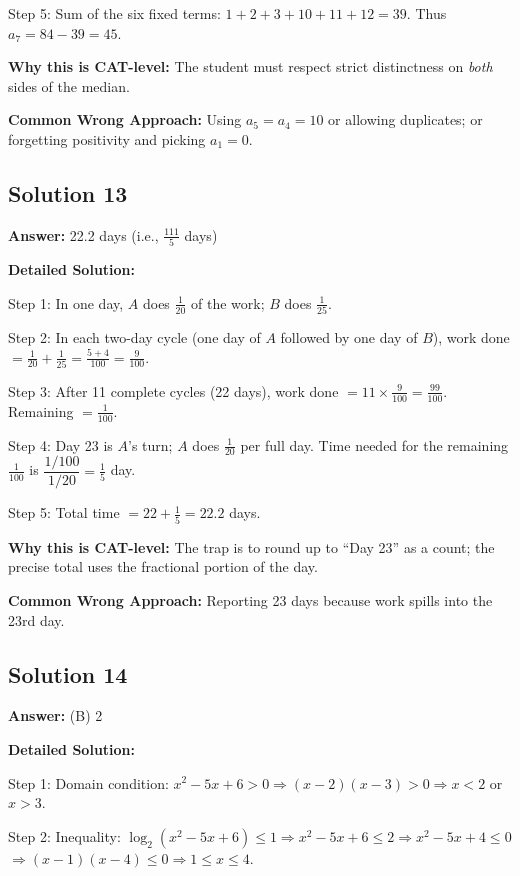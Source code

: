 \documentclass[11pt]{article}
\begin{document}
Step 5: Sum of the six fixed terms: \(1+2+3+10+11+12 = 39\). Thus \(a_7 = 84 - 39 = 45\).

\textbf{Why this is CAT-level:} The student must respect strict distinctness on \emph{both} sides of the median.

\textbf{Common Wrong Approach:} Using \(a_5 = a_4 = 10\) or allowing duplicates; or forgetting positivity and picking \(a_1 = 0\).

\subsection*{Solution 13}
\textbf{Answer:} 22.2 days (i.e., \(\tfrac{111}{5}\) days)

\textbf{Detailed Solution:}

Step 1: In one day, \(A\) does \(\tfrac{1}{20}\) of the work; \(B\) does \(\tfrac{1}{25}\).

Step 2: In each two-day cycle (one day of \(A\) followed by one day of \(B\)), work done \(= \tfrac{1}{20} + \tfrac{1}{25} = \tfrac{5+4}{100} = \tfrac{9}{100}\).

Step 3: After 11 complete cycles (22 days), work done \(= 11 \times \tfrac{9}{100} = \tfrac{99}{100}\). Remaining \(= \tfrac{1}{100}\).

Step 4: Day 23 is \(A\)'s turn; \(A\) does \(\tfrac{1}{20}\) per full day. Time needed for the remaining \(\tfrac{1}{100}\) is \(\dfrac{1/100}{1/20} = \tfrac{1}{5}\) day.

Step 5: Total time \(= 22 + \tfrac{1}{5} = 22.2\) days.

\textbf{Why this is CAT-level:} The trap is to round up to ``Day 23'' as a count; the precise total uses the fractional portion of the day.

\textbf{Common Wrong Approach:} Reporting 23 days because work spills into the 23rd day.

\subsection*{Solution 14}
\textbf{Answer:} (B) 2

\textbf{Detailed Solution:}

Step 1: Domain condition: \(x^{2}-5x+6 > 0 \Rightarrow (x-2)(x-3) > 0 \Rightarrow x < 2\) or \(x > 3\).

Step 2: Inequality: \(\log_{2}(x^{2}-5x+6) \le 1 \Rightarrow x^{2}-5x+6 \le 2 \Rightarrow x^{2}-5x+4 \le 0\)
\(\Rightarrow (x-1)(x-4) \le 0 \Rightarrow 1 \le x \le 4\).
\end{document}
